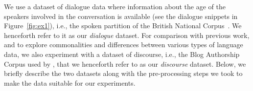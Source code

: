 
        


We use a dataset of dialogue data where information about the age of the speakers involved in the conversation is available (see the dialogue snippets in Figure~\ref{fig:ex1}), i.e., the spoken partition of the British National Corpus~\citep{love-spoken-bnc-2014}. We henceforth refer to it as our \emph{dialogue} dataset. For comparison with previous work,
and to explore commonalities and differences between various types of language data,
we also experiment with a dataset of discourse, i.e., the Blog Authorship Corpus used by \citet{schler2006effects}, that we henceforth refer to as our \emph{discourse} dataset.
Below, we briefly describe the two datasets along with the pre-processing steps we took to
make the data suitable for 
our experiments.

